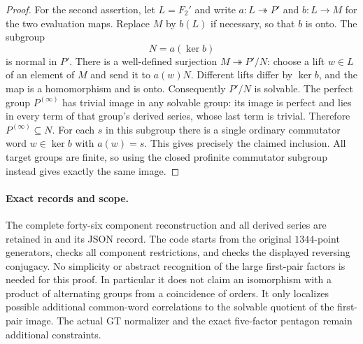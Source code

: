 \begin{proof}
For the second assertion, let $L=F_2'$ and write
$a:L\twoheadrightarrow P'$ and $b:L\to M$ for the two
evaluation maps. Replace $M$ by $b(L)$ if necessary, so
that $b$ is onto. The subgroup
\[
                         N=a(\ker b)
\]
is normal in $P'$. There is a well-defined surjection
$M\twoheadrightarrow P'/N$: choose a lift $w\in L$ of
an element of $M$ and send it to $a(w)N$. Different lifts
differ by $\ker b$, and the map is a homomorphism and is
onto. Consequently $P'/N$ is solvable. The perfect group
$P^{(\infty)}$ has trivial image in any solvable group:
its image is perfect and lies in every term of that group's
derived series, whose last term is trivial. Therefore
$P^{(\infty)}\subseteq N$. For each $s$ in this subgroup
there is a single ordinary commutator word $w\in\ker b$
with $a(w)=s$. This gives precisely the claimed inclusion.
All target groups are finite, so using the closed profinite
commutator subgroup instead gives exactly the same image.
\end{proof}

\paragraph{Exact records and scope.}
The complete forty-six component reconstruction and all
derived series are retained in
and its JSON record. The code starts from the original
$1344$-point generators, checks all component restrictions,
and checks the displayed reversing conjugacy. No simplicity
or abstract recognition of the large first-pair factors is
needed for this proof. In particular it does not claim an
isomorphism with a product of alternating groups from a
coincidence of orders. It only localizes possible additional
common-word correlations to the solvable quotient of the
first-pair image. The actual GT normalizer and the exact
five-factor pentagon remain additional constraints.
